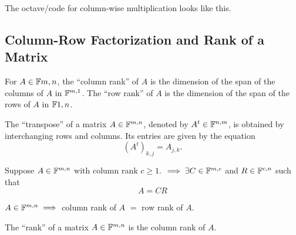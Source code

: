 \begin{thm}
\begin{enumerate}
    The octave\-/code for column-wise multiplication looks like this.
    \begin{center}
      \begin{minipage}{\linewidth}
        \addtolength{\linewidth}{-7em} 
        
        \addtolength{\linewidth}{+7em}
      \end{minipage}
    \end{center}
  \end{enumerate}
\end{thm}

\subsection{Column-Row Factorization and Rank of a Matrix}

\setcounter{thm}{51}
\begin{mydef}
  For $A \in \mathbb{F}{m,n}$, the ``column rank'' of $A$ is the dimension of the span of the columns of $A$ in $\mathbb{F}^{m,1}$. The ``row rank'' of $A$ is the dimension of the span of the rows of $A$ in $\mathbb{F}{1,n}$.
\end{mydef}

\setcounter{thm}{53}
\begin{mydef}
  The ``transpose'' of a matrix $A\in \mathbb{F}^{m,n}$, denoted by $A^t\in \mathbb{F}^{n,m}$, is obtained by interchanging rows and columns. Its entries are given by the equation
  \begin{equation}
    \left( A^{t} \right)_{k,j} = A_{j,k}.
  \end{equation}
\end{mydef}

\setcounter{thm}{55}
\begin{thm}
  Suppose $A \in \mathbb{F}^{m,n}$ with column rank $c \geq 1.$ $\implies \exists C\in \mathbb{F}^{m,c}$ and $R\in \mathbb{F}^{c,n}$ such that
  \begin{equation}
    A = CR
  \end{equation}
\end{thm}

\begin{thm}
  $A\in \mathbb{F}^{m,n} \implies$ column rank of $A$ $=$ row rank of $A$.
\end{thm}

\begin{mydef} [rank]
  The ``rank'' of a matrix $A \in  \mathbb{F}^{m,n}$ is the column rank of $A$.
\end{mydef}